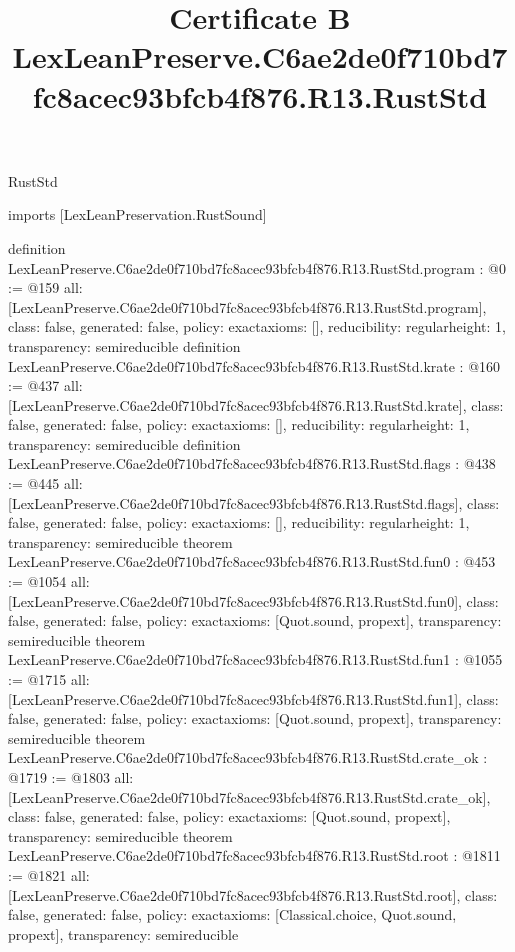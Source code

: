 \begin{lexlean}{RustStd}
\title{Certificate B LexLeanPreserve.C6ae2de0f710bd7fc8acec93bfcb4f876.R13.RustStd}
\begin{coremodule}
imports [LexLeanPreservation.RustSound]

definition LexLeanPreserve.C6ae2de0f710bd7fc8acec93bfcb4f876.R13.RustStd.program : @0 := @159 {
  all: [LexLeanPreserve.C6ae2de0f710bd7fc8acec93bfcb4f876.R13.RustStd.program],
  class: false,
  generated: false,
  policy: exact{axioms: []},
  reducibility: regular{height: 1},
  transparency: semireducible
}
definition LexLeanPreserve.C6ae2de0f710bd7fc8acec93bfcb4f876.R13.RustStd.krate : @160 := @437 {
  all: [LexLeanPreserve.C6ae2de0f710bd7fc8acec93bfcb4f876.R13.RustStd.krate],
  class: false,
  generated: false,
  policy: exact{axioms: []},
  reducibility: regular{height: 1},
  transparency: semireducible
}
definition LexLeanPreserve.C6ae2de0f710bd7fc8acec93bfcb4f876.R13.RustStd.flags : @438 := @445 {
  all: [LexLeanPreserve.C6ae2de0f710bd7fc8acec93bfcb4f876.R13.RustStd.flags],
  class: false,
  generated: false,
  policy: exact{axioms: []},
  reducibility: regular{height: 1},
  transparency: semireducible
}
theorem LexLeanPreserve.C6ae2de0f710bd7fc8acec93bfcb4f876.R13.RustStd.fun0 : @453 := @1054 {
  all: [LexLeanPreserve.C6ae2de0f710bd7fc8acec93bfcb4f876.R13.RustStd.fun0],
  class: false,
  generated: false,
  policy: exact{axioms: [Quot.sound, propext]},
  transparency: semireducible
}
theorem LexLeanPreserve.C6ae2de0f710bd7fc8acec93bfcb4f876.R13.RustStd.fun1 : @1055 := @1715 {
  all: [LexLeanPreserve.C6ae2de0f710bd7fc8acec93bfcb4f876.R13.RustStd.fun1],
  class: false,
  generated: false,
  policy: exact{axioms: [Quot.sound, propext]},
  transparency: semireducible
}
theorem LexLeanPreserve.C6ae2de0f710bd7fc8acec93bfcb4f876.R13.RustStd.crate_ok : @1719 := @1803 {
  all: [LexLeanPreserve.C6ae2de0f710bd7fc8acec93bfcb4f876.R13.RustStd.crate_ok],
  class: false,
  generated: false,
  policy: exact{axioms: [Quot.sound, propext]},
  transparency: semireducible
}
theorem LexLeanPreserve.C6ae2de0f710bd7fc8acec93bfcb4f876.R13.RustStd.root : @1811 := @1821 {
  all: [LexLeanPreserve.C6ae2de0f710bd7fc8acec93bfcb4f876.R13.RustStd.root],
  class: false,
  generated: false,
  policy: exact{axioms: [Classical.choice, Quot.sound, propext]},
  transparency: semireducible
}


\end{coremodule}
\end{lexlean}
